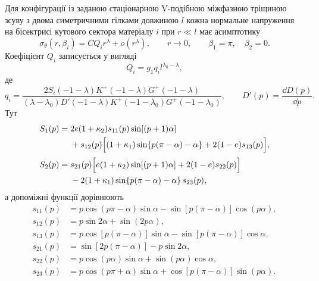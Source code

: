 Для конфігурації із заданою стаціонарною V-подібною міжфазною тріщиною
зсуву з двома симетричними гілками довжиною $l$ кожна нормальне напруження на бісектрисі кутового сектора матеріалу $i$ при $r\ll l$ має
асимптотику~\cite{NazarenkoKipnis2022Stress}
\begin{equation}
\label{eq:app-cracked-field}
  \sigma_\theta(r,\beta_i)
  =CQ_i r^\lambda+o\!\left(r^\lambda\right),
  \qquad r\to0,
  \qquad
  \beta_1=\pi,\quad \beta_2=0.
\end{equation}
Коефіцієнт $Q_i$ записується у вигляді
\begin{equation*}
  Q_i=g_1q_i l^{\lambda_0-\lambda},
\end{equation*}
де
\begin{equation*}
  q_i=
  \frac{2S_i(-1-\lambda)K^+(-1-\lambda)G^+(-1-\lambda)}
  {(\lambda-\lambda_0)D'(-1-\lambda)
   K^+(-1-\lambda_0)G^+(-1-\lambda_0)},
  \qquad
  D'(p)=\frac{\dd D(p)}{\dd p}.
\end{equation*}
Тут
\begin{equation*}
\begin{aligned}
  S_1(p)={}&2e(1+\kappa_2)s_{11}(p)\sin[(p+1)\alpha]\\
  &+s_{12}(p)
  \Bigl[(1+\kappa_1)\sin\{p(\pi-\alpha)-\alpha\}
        +2(1-e)s_{13}(p)\Bigr],\\[2pt]
  S_2(p)={}&s_{21}(p)
  \Bigl[e(1+\kappa_2)\sin[(p+1)\alpha]
        +2(1-e)s_{22}(p)\Bigr]\\
  &-2(1+\kappa_1)\sin\{p(\pi-\alpha)-\alpha\}\,s_{23}(p),
\end{aligned}
\end{equation*}
а допоміжні функції дорівнюють
\begin{equation*}
\begin{aligned}
  s_{11}(p)&=p\cos(p\pi-\alpha)\sin\alpha
             -\sin[p(\pi-\alpha)]\cos(p\alpha),\\
  s_{12}(p)&=p\sin2\alpha+\sin(2p\alpha),\\
  s_{13}(p)&=p\cos[p(\pi-\alpha)]\sin\alpha
             -\sin[p(\pi-\alpha)]\cos\alpha,\\
  s_{21}(p)&=\sin[2p(\pi-\alpha)]-p\sin2\alpha,\\
  s_{22}(p)&=p\cos(p\alpha)\sin\alpha
             +\sin(p\alpha)\cos\alpha,\\
  s_{23}(p)&=p\cos(p\pi+\alpha)\sin\alpha
             +\cos[p(\pi-\alpha)]\sin(p\alpha).
\end{aligned}
\end{equation*}

